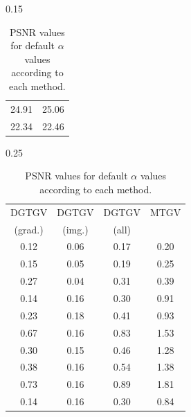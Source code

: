 \documentclass[twocolumn,envcountsame]{svjour3}
\begin{document}
\begin{table}[htb]
\begin{subtable}[t]{0.15\linewidth}
\begin{tabular}{cc}
24.91 & 25.06 \\                                                    
22.34 & 22.46 \\                                                  
\bottomrule                                                                           
\end{tabular}                                                                         
\caption{PSNR values for default $\alpha$ values according to each method.}
\label{table:MTGVvsDGTGVdefault}                                                      
\end{subtable}%
\hspace*{1em}
\begin{subtable}[t]{0.25\linewidth}
\centering
\setlength\tabcolsep{1.5pt}
\begin{tabular}{cccc}                                                                    
\toprule                                                                                  
{DGTGV} & {DGTGV} & 
{DGTGV} & {MTGV} \\                             
\multicolumn{1}{c}{(grad.)} & \multicolumn{1}{c}{(img.)} & 
\multicolumn{1}{c}{(all)} & \\
\midrule                                                                                  
0.12 & 0.06 & 0.17 & 0.20 \\                                                      
0.15 & 0.05 & 0.19 & 0.25 \\                                                     
0.27 & 0.04 & 0.31 & 0.39 \\                                                     
\midrule
0.14 & 0.16 & 0.30 & 0.91 \\                                                      
0.23 & 0.18 & 0.41 & 0.93 \\                                                      
0.67 & 0.16 & 0.83 & 1.53 \\                                                       
\midrule
0.30 & 0.15 & 0.46 & 1.28 \\                                                       
0.38 & 0.16 & 0.54 & 1.38 \\                                                        
0.73 & 0.16 & 0.89 & 1.81 \\                                                       
\midrule
0.14 & 0.16 & 0.30 & 0.84 \\                                                      

\end{tabular}
\end{subtable}
\end{table}
\end{document}
